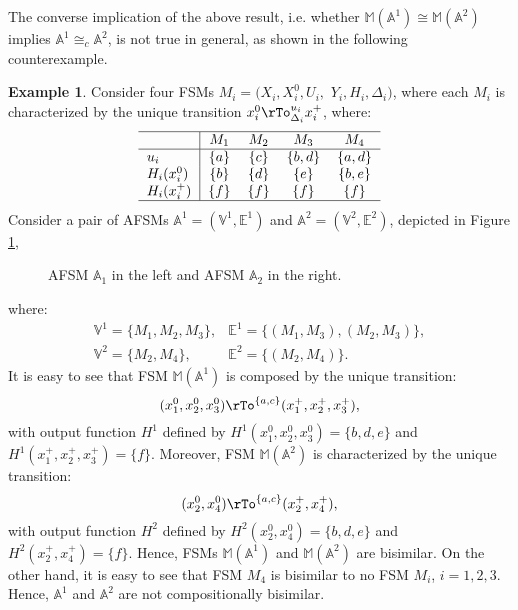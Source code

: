 \documentclass{amsart}
\theoremstyle{definition}
\newtheorem{example}[theorem]{Example}
\theoremstyle{remark}
\numberwithin{equation}{section}
\begin{document}
The converse implication of the above result, i.e. whether $\mathbb{M}(\mathbb{A}^{1}) \cong \mathbb{M}(\mathbb{A}^{2})$ implies $\mathbb{A}^{1} \cong_{c} \mathbb{A}^{2}$, is not true in general, as shown in the following counterexample. 
\begin{example}
Consider four FSMs $M_{i}=(X_{i},X^{0}_{i},U_{i},$ $Y_{i},H_{i},\Delta_{i})$, where each $M_{i}$ is characterized by the unique transition $x_{i}^{0}\rTo_{\Delta_{i}}^{u_{i}}x_{i}^{+}$, where:
\[
\begin{tabular}
[c]{l|cccc}
\hline
 & $M_{1}$ & $M_{2}$ & $M_{3}$ & $M_{4}$\\
\hline
$u_{i}$ & $\{a\}$ & $\{c\}$ & $\{b,d\}$ & $\{a,d\}$ \\
$H_{i}(x_{i}^{0})$ & $\{b\}$ & $\{d\}$ & $\{e\}$ & $\{b,e\}$\\
$H_{i}(x_{i}^{+})$ & $\{f\}$ & $\{f\}$ & $\{f\}$ & $\{f\}$\\
\hline
\end{tabular}
\]
Consider a pair of AFSMs $\mathbb{A}^{1}=(\mathbb{V}^{1},\mathbb{E}^{1})$ and $\mathbb{A}^{2}=(\mathbb{V}^{2},\mathbb{E}^{2})$, depicted in Figure \ref{figcounterexample}, 
\begin{figure}[t]
\centering
{}
\caption[]{AFSM $\mathbb{A}_{1}$ in the left and AFSM $\mathbb{A}_{2}$ in the right.}
\label{figcounterexample}
\end{figure}
where:
\[
\begin{array}
{ll}
\mathbb{V}^{1}=\{M_{1},M_{2},M_{3}\}, & \mathbb{E}^{1}=\{(M_{1},M_{3}),(M_{2},M_{3})\},\\
\mathbb{V}^{2}=\{M_{2},M_{4}\}, & \mathbb{E}^{2}=\{(M_{2},M_{4})\}. 
\end{array}
\]
It is easy to see that FSM $\mathbb{M}(\mathbb{A}^{1})$ is composed by the unique transition:
\[
(x_{1}^{0},x_{2}^{0},x_{3}^{0}) \rTo^{\{a,c\}} (x_{1}^{+},x_{2}^{+},x_{3}^{+}),
\]
with output function $H^{1}$ defined by $H^{1}(x_{1}^{0},x_{2}^{0},x_{3}^{0})=\{b,d,e\}$ and $H^{1}(x_{1}^{+},x_{2}^{+},x_{3}^{+})=\{f\}$. Moreover, FSM $\mathbb{M}(\mathbb{A}^{2})$ is characterized by the unique transition:
\[
(x_{2}^{0},x_{4}^{0}) \rTo^{\{a,c\}} (x_{2}^{+},x_{4}^{+}),
\]
with output function $H^{2}$ defined by $H^{2}(x_{2}^{0},x_{4}^{0})=\{b,d,e\}$ and $H^{2}(x_{2}^{+},x_{4}^{+})=\{f\}$. Hence, FSMs $\mathbb{M}(\mathbb{A}^{1})$ and $\mathbb{M}(\mathbb{A}^{2})$ are bisimilar. On the other hand, it is easy to see that FSM $M_{4}$ is bisimilar to no FSM $M_{i}$, $i=1,2,3$. Hence, $\mathbb{A}^{1}$ and $\mathbb{A}^{2}$ are not compositionally bisimilar.
\end{example}
\end{document}
